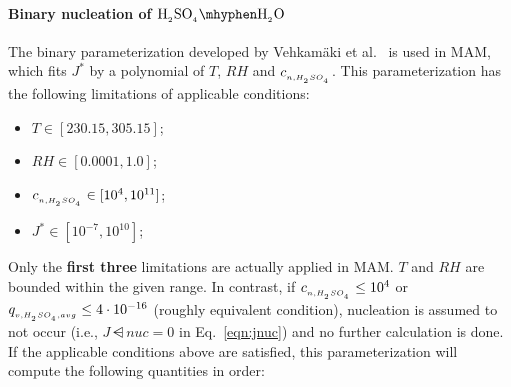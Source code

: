 \paragraph{Binary nucleation of $\rsag \mhyphen \rwater$}
The binary parameterization developed by Vehkam\"aki et al.~\citep{vehkamaki-2002-jgr}
is used in MAM, which fits $J^*$ by a polynomial of $T$, $RH$ and $c_{_{n,H_{_2}SO_{_4}}}$.
This parameterization has the following limitations of applicable conditions:
%
\begin{itemize}
\item $T \in [230.15, 305.15]$;
\item $RH \in [0.0001, 1.0]$;
\item $c_{_{n,H_{_2}SO_{_4}}} \in [10^4, 10^{11}]$;
\item $J^* \in [10^{-7}, 10^{10}]$;
\end{itemize}
%
Only the \textbf{first three} limitations are actually applied in MAM.
$T$ and $RH$ are bounded within the given range. In contrast,
if $c_{_{n,H_{_2}SO_{_4}}} \le 10^4$ or $q_{_{v,H_{_2}SO_{_4},avg}} \le 4 \cdot 10^{-16}$
(roughly equivalent condition), nucleation is assumed to not occur
(i.e., $J\dsub{nuc} = 0$ in Eq.~\eqref{eqn:jnuc}) and no further
calculation is done. If the applicable conditions above are satisfied,
this parameterization will compute the following quantities in order:
